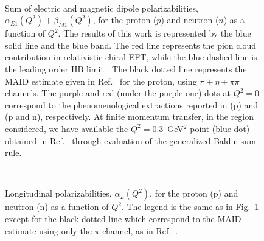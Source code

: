 \documentclass[prc,twocolumn,showpacs,preprintnumbers,amsmath,amssymb
,superscriptaddress,a4paper,nofootinbib
]{revtex4-1}
\begin{document}
\begin{figure}[t]
\begin{center}
\hspace{-0.3cm} \\
\hspace{-0.3cm} 
\caption{Sum of electric and magnetic dipole polarizabilities, $\alpha_{E1}(Q^2)+\beta_{M1}(Q^2)$, for the proton ($p$) and neutron ($n$) as a function of $Q^2$.  
The results of this work is represented by the blue solid line and the blue band. The red line represents the pion cloud contribution in relativistic chiral EFT, while the blue dashed line is the leading order HB limit \cite{Nevado:2007dd}.
The black dotted line represents the MAID estimate \cite{Drechsel:2000ct,Drechsel:1998hk} given in Ref.~\cite{Drechsel:2002ar} for the proton, using $\pi+\eta+\pi\pi$ channels. The purple and red (under the purple one) dots at $Q^2=0$ correspond to the phenomenological extractions reported in \cite{OlmosdeLeon:2001zn} (p) and \cite{Babusci:1997ij} (p and n), respectively. 
At finite momentum transfer, in the region considered, we have available the $Q^2=0.3$~GeV$^2$ point (blue dot) obtained in Ref.~\cite{Liang:2004tk} through evaluation of the generalized Baldin sum rule. \label{Fig:alpha+betaplot}}
\end{center}
\end{figure}

\begin{figure}[t]
\begin{center}
\hspace{-0.3cm}\\ \hspace{-0.3cm}
\caption{Longitudinal polarizabilities, $\alpha_L (Q^2)$, for the proton  (p) and neutron (n) as a function of $Q^2$. The legend is the same as in Fig.~\ref{Fig:alpha+betaplot} except for the black dotted line which correspond to the MAID estimate using only the $\pi$-channel, as in Ref.~\cite{Drechsel:2002ar}.  \label{Fig:alphaLplot}}
\end{center}
\end{figure}
\end{document}
